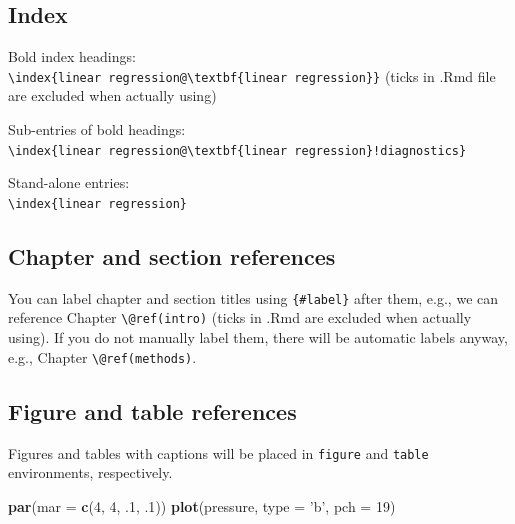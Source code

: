 \documentclass[
]{book}
\newenvironment{Shaded}{\begin{snugshade}}{\end{snugshade}}
\newcommand{\DataTypeTok}[1]{\textcolor[rgb]{0.13,0.29,0.53}{#1}}
\newcommand{\DecValTok}[1]{\textcolor[rgb]{0.00,0.00,0.81}{#1}}
\newcommand{\FloatTok}[1]{\textcolor[rgb]{0.00,0.00,0.81}{#1}}
\newcommand{\KeywordTok}[1]{\textcolor[rgb]{0.13,0.29,0.53}{\textbf{#1}}}
\newcommand{\NormalTok}[1]{#1}
\newcommand{\StringTok}[1]{\textcolor[rgb]{0.31,0.60,0.02}{#1}}
\begin{document}
\hypertarget{index}{%
\subsection{Index}\label{index}}

Bold index headings:\\
\texttt{\textbackslash{}index\{linear\ regression@\textbackslash{}textbf\{linear\ regression\}\}} (ticks in .Rmd file are excluded when actually using)

Sub-entries of bold headings:\\
\texttt{\textbackslash{}index\{linear\ regression@\textbackslash{}textbf\{linear\ regression\}!diagnostics\}}

Stand-alone entries:\\
\texttt{\textbackslash{}index\{linear\ regression\}}

\hypertarget{chapter-and-section-references}{%
\subsection{Chapter and section references}\label{chapter-and-section-references}}

You can label chapter and section titles using \texttt{\{\#label\}} after them, e.g., we can reference Chapter \texttt{\textbackslash{}@ref(intro)} (ticks in .Rmd are excluded when actually using). If you do not manually label them, there will be automatic labels anyway, e.g., Chapter \texttt{\textbackslash{}@ref(methods)}.

\hypertarget{figure-and-table-references}{%
\subsection{Figure and table references}\label{figure-and-table-references}}

Figures and tables with captions will be placed in \texttt{figure} and \texttt{table} environments, respectively.

\begin{Shaded}
\begin{Highlighting}[]
\KeywordTok{par}\NormalTok{(}\DataTypeTok{mar =} \KeywordTok{c}\NormalTok{(}\DecValTok{4}\NormalTok{, }\DecValTok{4}\NormalTok{, }\FloatTok{.1}\NormalTok{, }\FloatTok{.1}\NormalTok{))}
\KeywordTok{plot}\NormalTok{(pressure, }\DataTypeTok{type =} \StringTok{'b'}\NormalTok{, }\DataTypeTok{pch =} \DecValTok{19}\NormalTok{)}
\end{Highlighting}
\end{Shaded}
\end{document}
